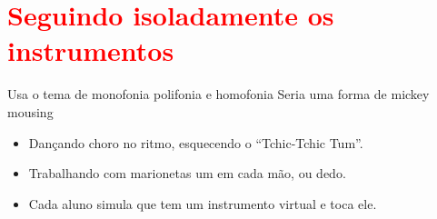 \newpage

\section{\textcolor{red}{Seguindo isoladamente os instrumentos}}

Usa o tema de monofonia polifonia e homofonia
Seria uma forma de mickey mousing
\begin{itemize}
\item Dançando choro no ritmo, esquecendo o ``Tchic-Tchic Tum''.
\item Trabalhando com marionetas um em cada mão, ou dedo.
\item Cada aluno simula que tem um instrumento virtual e toca ele.
\end{itemize}
